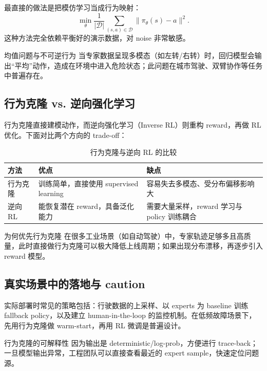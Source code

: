 \documentclass[a4paper]{article}
\begin{document}
最直接的做法是把模仿学习当成行为映射：
$$\min_\theta \frac{1}{|\mathcal{D}|}\sum_{(s,a) \in \mathcal{D}} \|\pi_\theta(s) - a\|^2.$$
这种方法完全依赖平衡好的演示数据，对 noise 非常敏感。

\begin{warningbox}{均值问题与不可逆行为}
当专家数据呈现多模态（如左转/右转）时，回归模型会输出“平均”动作，造成在环境中进入危险状态；此问题在城市驾驶、双臂协作等任务中普遍存在。
\end{warningbox}

\subsection{行为克隆 vs. 逆向强化学习}

行为克隆直接建模动作，而逆向强化学习（Inverse RL）则重构 reward，再做 RL 优化。下面对比两个方向的 trade-off：

\begin{table}[H]
\centering
\begin{tabular}{p{} p{} p{}}
\toprule
方法 & 优点 & 缺点 \\
\midrule
行为克隆 & 训练简单，直接使用 supervised learning & 容易失去多模态、受分布偏移影响大 \\
逆向 RL & 能恢复潜在 reward，具备泛化能力 & 需要大量采样，reward 学习与 policy 训练耦合 \\
\bottomrule
\end{tabular}
\caption{行为克隆与逆向 RL 的比较}
\end{table}

\begin{knowledgebox}{为何优先行为克隆}
在很多工业场景（如自动驾驶）中，专家轨迹足够多且高质量，此时直接做行为克隆可以极大降低上线周期；如果出现分布漂移，再逐步引入 reward 模型。
\end{knowledgebox}

\subsection{真实场景中的落地与 caution}

实际部署时常见的策略包括：行驶数据的上采样、以 experts 为 baseline 训练 fallback policy，以及建立 human-in-the-loop 的监控机制。在低频故障场景下，先用行为克隆做 warm-start，再用 RL 微调是普遍设计。

\begin{importantbox}{行为克隆的可解释性}
因为输出是 deterministic/log-prob，方便进行 trace-back；一旦模型输出异常，工程团队可以直接查看最近的 expert sample，快速定位问题源。
\end{importantbox}
\end{document}
